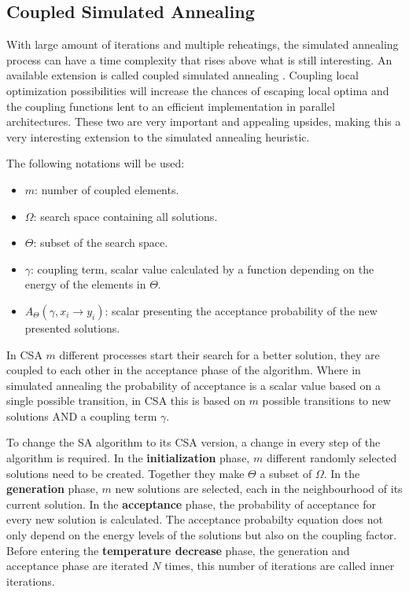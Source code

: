 \subsection{Coupled Simulated Annealing}
With large amount of iterations and multiple reheatings, the simulated annealing process can have a time complexity that rises above what is still interesting.
An available extension is called coupled simulated annealing \cite{csa2007}.
Coupling local optimization possibilities will increase the chances of escaping local optima and the coupling functions lent to an efficient implementation in parallel architectures. \cite{CoLoMi2002} \cite{csa2007}
These two are very important and appealing upsides, making this a very interesting extension to the simulated annealing heuristic.
\par 
The following notations will be used:
\begin{itemize}
	\item $m$: number of coupled elements.
	\item $\Omega$: search space containing all solutions.
	\item $\Theta$: subset of the search space.
	\item $\gamma$: coupling term, scalar value calculated by a function depending on the energy of the elements in $\Theta$.
	\item $A_\Theta (\gamma,x_i \rightarrow y_i)$: scalar presenting the acceptance probability of the new presented solutions.
\end{itemize}
In CSA $m$ different processes start their search for a better solution, they are coupled to each other in the acceptance phase of the algorithm.
Where in simulated annealing the probability of acceptance is a scalar value based on a single possible transition, in CSA this is based on $m$ possible transitions to new solutions AND a coupling term $\gamma$.
\par 
To change the SA algorithm to its CSA version, a change in every step of the algorithm is required.
In the \textbf{initialization} phase, $m$ different randomly selected solutions need to be created.
Together they make $\Theta$ a subset of $\Omega$.
In the \textbf{generation} phase, $m$ new solutions are selected, each in the neighbourhood of its current solution.
In the \textbf{acceptance} phase, the probability of acceptance for every new solution is calculated. 
The acceptance probabilty equation does not only depend on the energy levels of the solutions but also on the coupling factor.
Before entering the \textbf{temperature decrease} phase, the generation and acceptance phase are iterated $N$ times, this number of iterations are called inner iterations.
